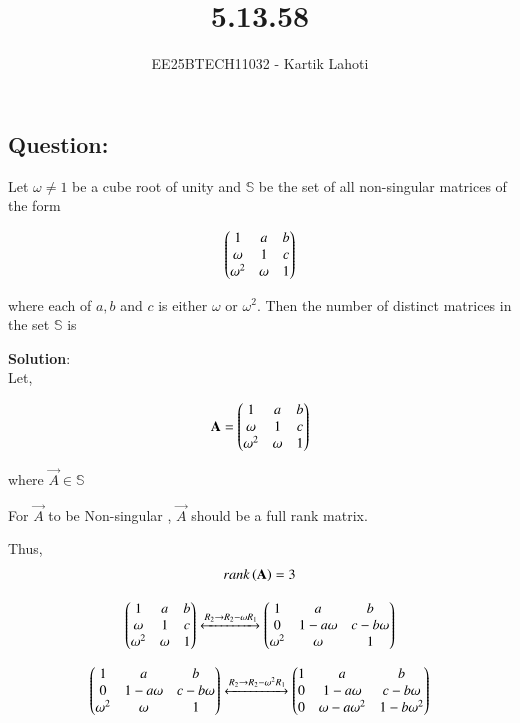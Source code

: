 \documentclass[journal]{IEEEtran}
\numberwithin{equation}{enumi}
\numberwithin{figure}{enumi}
\begin{document}

\vspace{3cm}

\title{5.13.58}
\author{EE25BTECH11032 - Kartik Lahoti}
\maketitle

\subsection*{Question: } 
Let $\omega \neq 1$ be a cube root of unity and $\mathbb{S}$ be the set of all non-singular matrices of the form 

\begin{align}
    \begin{pmatrix}1 & a & b \\ \omega & 1 & c \\ \omega^2 & \omega & 1\end{pmatrix}
\end{align}

where each of $a,b$ and $c$ is either $\omega$ or $\omega^2$. Then the number of distinct matrices in the set $\mathbb{S}$ is

\textbf{Solution}:\\


Let,

\begin{align}
    \mathbf{A} = \begin{pmatrix}1 & a & b \\ \omega & 1 & c \\ \omega^2 & \omega & 1\end{pmatrix}
\end{align}

where $\vec{A} \in \mathbb{S}$

For $\vec{A}$ to be Non-singular , $\vec{A}$ should be a full rank matrix.

Thus, 
\begin{align}
    rank\left(\mathbf{A}\right) = 3 
\end{align}


\begin{align}
    \begin{pmatrix}1 & a & b \\ \omega & 1 & c \\ \omega^2 & \omega & 1\end{pmatrix} \xleftrightarrow[]{R_2\rightarrow R_2 - \omega R_1 }\begin{pmatrix}1 & a & b \\ 0 & 1-a\omega & c-b\omega \\ \omega^2 & \omega & 1\end{pmatrix}
\end{align}

\begin{align}
    \begin{pmatrix}1 & a & b \\ 0 & 1-a\omega & c-b\omega \\ \omega^2 & \omega & 1\end{pmatrix} \xleftrightarrow[]{R_2\rightarrow R_2 - \omega^2 R_1 }\begin{pmatrix}1 & a & b \\ 0 & 1-a\omega & c-b\omega \\ 0 & \omega - a\omega^2 & 1-b\omega^2\end{pmatrix}
\end{align}
\end{document}
